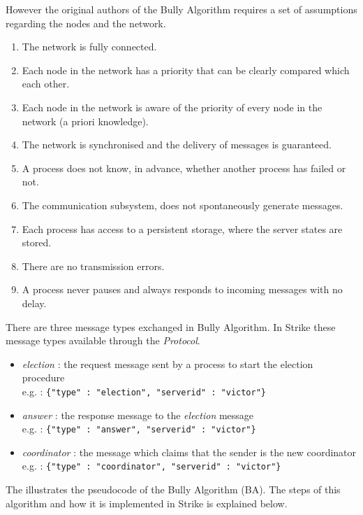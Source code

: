 \documentclass[dareport.tex]{subfiles}
\begin{document}
However the original authors of the Bully Algorithm requires a set of assumptions regarding the nodes and the network\cite{election}.
\begin{enumerate}\label{ba-assumptions}
	\item The network is fully connected.\label{assumption:1}
	\item Each node in the network has a priority that can be clearly compared which each other.\label{assumption:2}
	\item Each node in the network is aware of the priority of every node in the network (a priori knowledge).\label{assumption:3}
	\item The network is synchronised and the delivery of messages is guaranteed.\label{assumption:4}
	\item A process does not know, in advance, whether another process has failed or not.\label{assumption:5}
	\item The communication subsystem, does not spontaneously generate messages.\label{assumption:6}
	\item Each process has access to a persistent storage, where the server states are stored.\label{assumption:7}
	\item There are no transmission errors.\label{assumption:8}
	\item A process never pauses and always responds to incoming messages with no delay.\label{assumption:9}
\end{enumerate}
There are three message types exchanged in Bully Algorithm. In Strike these message types available through the \emph{Protocol}.
\begin{itemize}\label{ba-message-types}
	\item \emph{election} : the request message sent by a process to start the election procedure\\
	e.g. : \verb|{"type" : "election", "serverid" : "victor"}|
	\item \emph{answer} : the response message to the \emph{election} message\\
	e.g. : \verb|{"type" : "answer", "serverid" : "victor"}|
	\item \emph{coordinator} : the message which claims that the sender is the new coordinator\\
	e.g. : \verb|{"type" : "coordinator", "serverid" : "victor"}|
\end{itemize}
The  illustrates the pseudocode of the Bully Algorithm (BA). The steps of this algorithm and how it is implemented in Strike is explained below.
\end{document}

